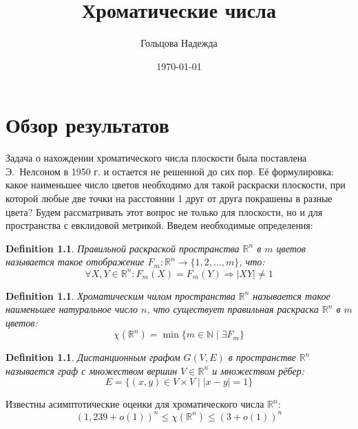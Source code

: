 \documentclass{report}%
\newtheorem{definition}[theorem]{Definition}
\begin{document}
\frenchspacing

\title{Хроматические числа}
\author{Гольцова Надежда}
\date{\today}
\maketitle

\chapter{Обзор результатов}

Задача о нахождении хроматического числа плоскости была поставлена             
Э.~Нелсоном в 1950 г. и остается не решенной до сих пор. Её формулировка: 
какое наименьшее число цветов необходимо для такой раскраски плоскости, 
при которой любые две точки на расстоянии 1 друг от друга покрашены в 
разные цвета? 
Будем рассматривать этот вопрос не только для плоскости, но и для 
пространства с евклидовой метрикой. Введем необходимые определения:

\begin{definition}
		Правильной раскраской пространства $\mathbb{R}^n$ в $m$ цветов называется
		такое отображение $F_m \colon \mathbb{R}^n \rightarrow \{1, 2, \ldots , m \}$, что:
		\begin{equation}
				\forall X, Y \in \mathbb{R}^n \colon F_m(X) = F_m(Y) \Rightarrow |XY| \ne 1
		\end{equation}
\end{definition}

\begin{definition}
		Хроматическим чилом пространства $\mathbb{R}^n$ называется такое наименьшее
		натуральное число $n$, что существует правильная раскраска $\mathbb{R}^n$ в
		$m$ цветов:
		\begin{equation}
				\chi(\mathbb{R}^n) = \min \{m \in \mathbb{N} \mid \exists F_m\}
		\end{equation}
\end{definition}

\begin{definition}
		Дистанционным графом $G(V, E)$ в пространстве $\mathbb{R}^n$ называется граф
		с множеством вершин $V \in \mathbb{R}^n$ и множеством рёбер:
		\begin{equation}
				E = \{(x, y) \in V \times V \mid |x - y| = 1 \}
		\end{equation}
\end{definition}

\noindent Известны асимптотические оценки для хроматического числа $\mathbb{R}^n$:
\begin{equation}
		(1,239 + o(1))^n \leq \chi(\mathbb{R}^n) \leq (3 + o(1))^n
\end{equation}
\end{document}
